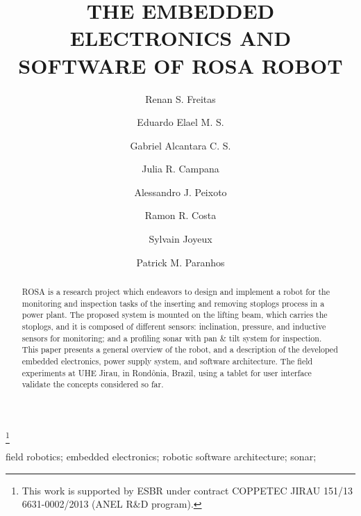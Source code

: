 \documentclass{main}
\begin{document}
\begin{frontmatter}

\title{THE EMBEDDED ELECTRONICS AND SOFTWARE OF ROSA ROBOT
} 

\thanks[footnoteinfo]{This work is supported by ESBR under contract COPPETEC
JIRAU 151/13 6631-0002/2013 (ANEL R\&D program).}

\author[1]{Renan S. Freitas}
\author[1]{Eduardo Elael M. S.}
\author[1]{Gabriel Alcantara C. S.}
\author[2]{Julia R. Campana}
\author[1]{Alessandro J. Peixoto}
\author[1]{Ramon R. Costa}
\author[3]{Sylvain Joyeux}
\author[3]{Patrick M. Paranhos}

  \address[1]{Electrical
 Engineering Department, COPPE UFRJ, Rio de Janeiro, Brazil}
  \address[2]{Professional and Technical Communication, Illinois Institute of
  Technology, Illinois, United States} 
  \address[3]{Research Department Robotics Innovation Center, German Research
 Centre for Artificial Intelligence (DFKI), Bremen, Germany}
 
\begin{abstract}                %
ROSA is a research project which endeavors to design and implement a robot for
the monitoring and inspection tasks of the inserting and removing stoplogs
process in a power plant. The proposed system is mounted on the lifting beam,
which carries the stoplogs, and it is composed of different sensors:
inclination, pressure, and inductive sensors for monitoring; and a profiling
sonar with pan \& tilt system for inspection. This paper presents a general
overview of the robot, and a description of the developed embedded electronics, power supply system,
and software architecture. The field experiments at UHE Jirau, in Rond{\^o}nia,
Brazil, using a tablet for user interface validate the concepts considered so far.
\end{abstract} 

\begin{keyword}
field robotics; embedded electronics; robotic software architecture; sonar;
\end{keyword}

\end{frontmatter}








  
 
\appendix
\end{document}
